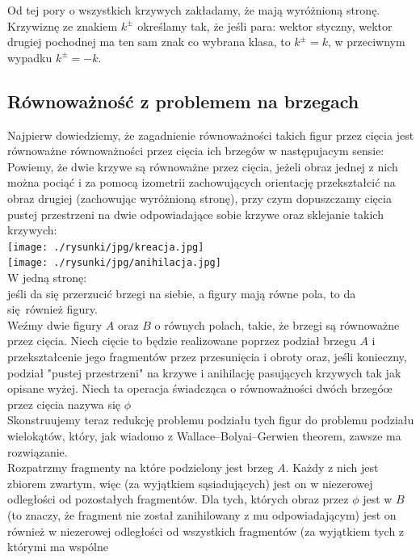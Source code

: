 \documentclass[a4paper, 12pt]{article}
\newcommand{\rysunek}[1]{\hfill \break\\[16pt] \Huge \textbf{\textcolor{violet}{Brakujący rysunek \normalsize
#1}} \hfill
\break \\[16pt] \normalsize}
\begin{document}
Od tej pory o wszystkich krzywych zakładamy, że mają wyróżnioną stronę.
Krzywiznę ze znakiem $k^\pm$ określamy tak, że jeśli para: wektor styczny, wektor drugiej pochodnej ma ten
sam znak co wybrana klasa, to $k^\pm = k$, w przeciwnym wypadku $k^\pm = -k$.
\subsection{Równoważność z problemem na brzegach}
Najpierw dowiedziemy, że zagadnienie równoważności takich figur przez cięcia jest równoważne równoważności
przez cięcia ich brzegów w następujacym sensie: \\
Powiemy, że dwie krzywe są równoważne przez cięcia, jeżeli obraz jednej z nich można pociąć i za pomocą
izometrii zachowujących orientację przekształcić na obraz drugiej (zachowując wyróżnioną stronę), przy czym dopuszczamy cięcia pustej
przestrzeni na dwie
odpowiadające sobie krzywe oraz sklejanie takich krzywych: \\
\texttt{[image: ./rysunki/jpg/kreacja.jpg]} \\
\texttt{[image: ./rysunki/jpg/anihilacja.jpg]} \\
W jedną stronę: \\
jeśli da się przerzucić brzegi na siebie, a figury mają równe pola, to da się również figury. \\
Weźmy dwie figury $A$ oraz $B$ o równych polach, takie, że brzegi są równoważne przez cięcia. Niech cięcie
to będzie realizowane poprzez podział brzegu $A$ i przekształcenie jego fragmentów przez przesunięcia
i obroty oraz,
jeśli konieczny, podział "pustej przestrzeni" na krzywe i anihilację pasujących krzywych tak jak opisane
wyżej. Niech ta operacja świadcząca o równoważności dwóch brzegóœ przez cięcia nazywa się $\phi$ \\
Skonstruujemy teraz redukcję problemu podziału tych figur do problemu podziału wielokątów, który, jak wiadomo
 z Wallace–Bolyai–Gerwien theorem, zawsze ma rozwiązanie. \\
Rozpatrzmy fragmenty na które podzielony jest brzeg $A$. Każdy z nich jest zbiorem zwartym, więc
(za wyjątkiem sąsiadujących) jest on w niezerowej odległości od pozostałych fragmentów. Dla tych, których
 obraz przez $\phi$ jest w $B$ (to znaczy, że fragment nie został zanihilowany z mu odpowiadającym)
 jest on również w niezerowej odległości od wszystkich fragmentów (za wyjątkiem tych z którymi ma wspólne
\end{document}
